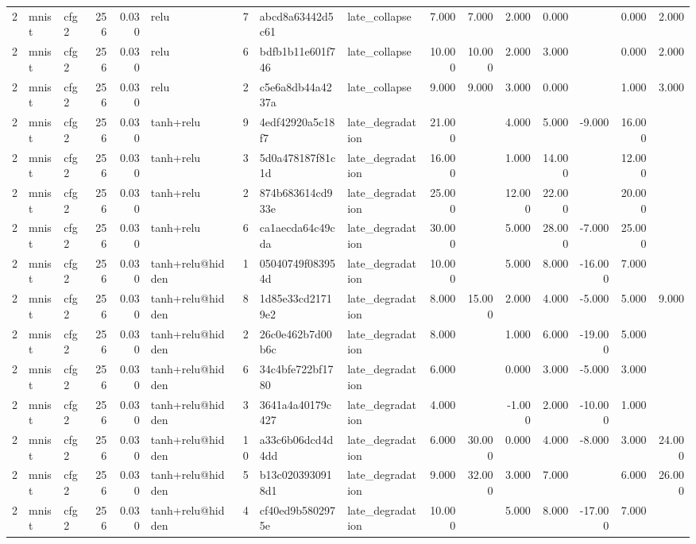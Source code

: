 \begin{table}[htbp]
{\begin{tabular}{@{}rllrrlrllrrrrrrr@{}}
2 & mnist & cfg2 & 256 & 0.030 & relu & 7 & abcd8a63442d5c61 & late\_collapse & 7.000 & 7.000 & 2.000 & 0.000 &  & 0.000 & 2.000 \\
2 & mnist & cfg2 & 256 & 0.030 & relu & 6 & bdfb1b11e601f746 & late\_collapse & 10.000 & 10.000 & 2.000 & 3.000 &  & 0.000 & 2.000 \\
2 & mnist & cfg2 & 256 & 0.030 & relu & 2 & c5e6a8db44a4237a & late\_collapse & 9.000 & 9.000 & 3.000 & 0.000 &  & 1.000 & 3.000 \\
2 & mnist & cfg2 & 256 & 0.030 & tanh+relu & 9 & 4edf42920a5c18f7 & late\_degradation & 21.000 &  & 4.000 & 5.000 & -9.000 & 16.000 &  \\
2 & mnist & cfg2 & 256 & 0.030 & tanh+relu & 3 & 5d0a478187f81c1d & late\_degradation & 16.000 &  & 1.000 & 14.000 &  & 12.000 &  \\
2 & mnist & cfg2 & 256 & 0.030 & tanh+relu & 2 & 874b683614cd933e & late\_degradation & 25.000 &  & 12.000 & 22.000 &  & 20.000 &  \\
2 & mnist & cfg2 & 256 & 0.030 & tanh+relu & 6 & ca1aecda64c49cda & late\_degradation & 30.000 &  & 5.000 & 28.000 & -7.000 & 25.000 &  \\
2 & mnist & cfg2 & 256 & 0.030 & tanh+relu@hidden & 1 & 05040749f083954d & late\_degradation & 10.000 &  & 5.000 & 8.000 & -16.000 & 7.000 &  \\
2 & mnist & cfg2 & 256 & 0.030 & tanh+relu@hidden & 8 & 1d85e33cd21719e2 & late\_degradation & 8.000 & 15.000 & 2.000 & 4.000 & -5.000 & 5.000 & 9.000 \\
2 & mnist & cfg2 & 256 & 0.030 & tanh+relu@hidden & 2 & 26c0e462b7d00b6c & late\_degradation & 8.000 &  & 1.000 & 6.000 & -19.000 & 5.000 &  \\
2 & mnist & cfg2 & 256 & 0.030 & tanh+relu@hidden & 6 & 34c4bfe722bf1780 & late\_degradation & 6.000 &  & 0.000 & 3.000 & -5.000 & 3.000 &  \\
2 & mnist & cfg2 & 256 & 0.030 & tanh+relu@hidden & 3 & 3641a4a40179c427 & late\_degradation & 4.000 &  & -1.000 & 2.000 & -10.000 & 1.000 &  \\
2 & mnist & cfg2 & 256 & 0.030 & tanh+relu@hidden & 10 & a33c6b06dcd4d4dd & late\_degradation & 6.000 & 30.000 & 0.000 & 4.000 & -8.000 & 3.000 & 24.000 \\
2 & mnist & cfg2 & 256 & 0.030 & tanh+relu@hidden & 5 & b13c0203930918d1 & late\_degradation & 9.000 & 32.000 & 3.000 & 7.000 &  & 6.000 & 26.000 \\
2 & mnist & cfg2 & 256 & 0.030 & tanh+relu@hidden & 4 & cf40ed9b5802975e & late\_degradation & 10.000 &  & 5.000 & 8.000 & -17.000 & 7.000 &  \\

\end{tabular}}
\end{table}
